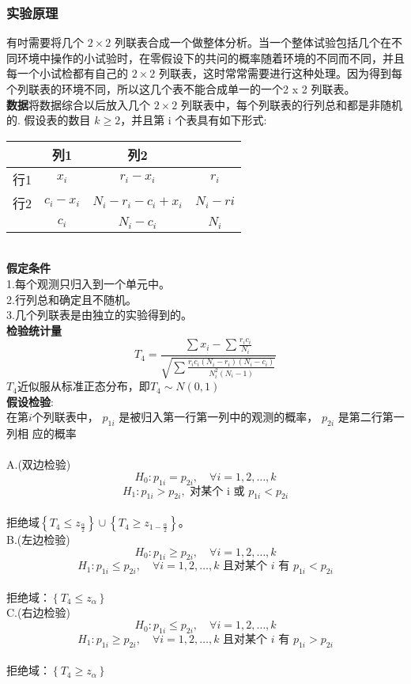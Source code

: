 \documentclass[a4paper, 11pt]{article}
\begin{document}
\subsubsection{实验原理}
有吋需要将几个 $ 2 \times 2 $ 列联表合成一个做整体分析。当一个整体试验包括几个在不同环境中操作的小试验时，在零假设下的共问的概率随着环境的不同而不同，并且每一个小试检都有自己的 $ 2 \times 2 $ 列联表，这时常常需要进行这种处理。因为得到每个列联表的环境不同，所以这几个表不能合成单一的一个2 x 2 列联表。\\
\textbf{数据}\quad 将数据综合以后放入几个 $ 2 \times 2 $ 列联表中，每个列联表的行列总和都是非随机的.
假设表的数目 $ k \geq 2 $，并且第 i 个表具有如下形式:
\begin{table}[!h]
	\centering
	\begin{tabular}{|c|c|c|c|}
		\hline
		&列1&列2&\\
		\hline
		行1&$ x_{i} $&$ r_{i}-x_{i} $&$ r_{i} $\\
		\hline
		行2&$ c_{i}-x_{i} $&$ N_{i}-r_{i}-c_{i}+x_{i} $&$ N_{i}-r{i} $\\
		\hline
		&$ c_{i} $&$ N_{i}-c_{i} $&$ N_{i} $\\
		\hline
	\end{tabular}
\end{table}\\
\textbf{假定条件} \\
\indent 1.每个观测只归入到一个单元中。\\
\indent 2.行列总和确定且不随机。\\
\indent 3.几个列联表是由独立的实验得到的。\\
\textbf{检验统计量}\\
$$T_{4}=\frac{\sum x_{i}-\sum \frac{r_{i} c_{i}}{N_{i}}}{\sqrt{\sum \frac{r_{i} c_{i}\left(N_{i}-r_{i}\right)\left(N_{i}-c_{i}\right)}{N_{i}^{2}\left(N_{i}-1\right)}}}$$
$ T_{4} $近似服从标准正态分布，即$ T_{4}\sim N(0,1) $\\
\textbf{假设检验}:\\
在第$ i $个列联表中， $p_{1 i}$ 是被归入第一行第一列中的观测的概率， $p_{2 i}$ 是第二行第一列相
应的概率\\
\\A.(双边检验)
$$H_{0}: p_{1 i}=p_{2 i}, \quad \forall i=1,2, \dots, k$$
$$H_{1}: p_{1 i}>p_{2 i}, \text { 对某个 } \mathrm{i} \text { 或 } p_{1 i}<p_{2 i}$$
\\拒绝域$\left\{T_{4} \leq z_{\frac{\alpha}{2}}\right\} \cup\left\{T_{4} \geq z_{1-\frac{\alpha}{2}}\right\}$。
\\B.(左边检验)
$$H_{0}: p_{1 i}\geq p_{2 i}, \quad \forall i=1,2, \dots, k$$
$$H_{1}: p_{1 i} \leq p_{2 i}, \quad \forall i=1,2, \ldots, k \text { 且对某个 } i \text { 有 } p_{1 i}<p_{2 i}$$
\\拒绝域：$ \left\{T_{4} \leq z_{\alpha}\right\} $
\\C.(右边检验)
$$H_{0}: p_{1 i}\leq p_{2 i}, \quad \forall i=1,2, \dots, k$$
$$H_{1}: p_{1 i} \geq p_{2 i}, \quad \forall i=1,2, \ldots, k \text { 且对某个 } i \text { 有 } p_{1 i}>p_{2 i}$$
\\拒绝域：$ \left\{T_{4} \geq z_{\alpha}\right\} $
\end{document}
